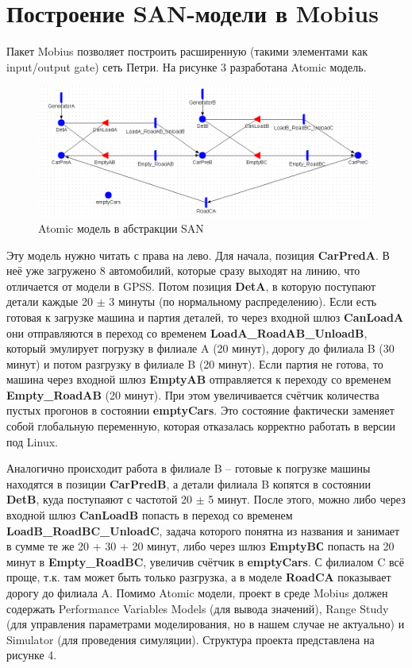\documentclass[a4paper, 12pt]{article}        %
\begin{document}


\newpage
\section{Построение SAN-модели в Mobius}

Пакет Mobius позволяет построить расширенную (такими элементами как input/output gate) сеть Петри. На рисунке 3 разработана Atomic модель.

\begin{figure}[h!]
\centering
\includegraphics[scale=0.7]{res/pic003}
\caption{Atomic модель в абстракции SAN}
\end{figure}

Эту модель нужно читать с права на лево. Для начала, позиция \textbf{CarPredA}. В неё уже загружено 8 автомобилий, которые сразу выходят на линию, что отличается от модели в GPSS. Потом позиция \textbf{DetA}, в которую поступают детали каждые 20 $\pm$ 3 минуты (по нормальному распределению). Если есть готовая к загрузке машина и партия деталей, то через входной шлюз \textbf{CanLoadA} они отправляются в переход со временем \textbf{LoadA\_RoadAB\_UnloadB}, который эмулирует погрузку в филиале A (20 минут), дорогу до филиала B (30 минут) и потом разгрузку в филиале B (20 минут). Если партия не готова, то машина через входной шлюз \textbf{EmptyAB} отправляется к переходу со временем \textbf{Empty\_RoadAB} (20 минут). При этом увеличивается счётчик количества пустых прогонов в состоянии \textbf{emptyCars}. Это состояние фактически заменяет собой глобальную переменную, которая отказалась корректно работать в версии под Linux.

Аналогично происходит работа в филиале B -- готовые к погрузке машины находятся в позиции \textbf{CarPredB}, а детали филиала B копятся в состоянии \textbf{DetB}, куда поступаяют с частотой  20 $\pm$ 5 минут. После этого, можно либо через входной шлюз \textbf{CanLoadB} попасть в переход со временем \textbf{LoadB\_RoadBC\_UnloadC}, задача которого понятна из названия и занимает в сумме те же 20 + 30 + 20 минут, либо через шлюз \textbf{EmptyBС} попасть на 20 минут в \textbf{Empty\_RoadBC}, увеличив счётчик в \textbf{emptyCars}. С филиалом C всё проще, т.к. там может быть только разгрузка, а в моделе \textbf{RoadCA} показывает дорогу до филиала A.
\newpage
Помимо Atomic модели, проект в среде Mobius должен содержать Performance Variables Models (для вывода значений), Range Study (для управления параметрами моделирования, но в нашем случае не актуально) и Simulator (для проведения симуляции). Структура проекта представлена на рисунке 4.
\end{document}
